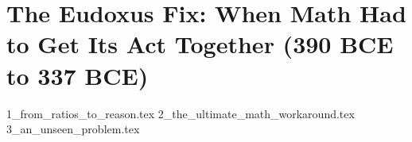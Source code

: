 \section{The Eudoxus Fix: When Math Had to Get Its Act Together (390 BCE to 337 BCE)}

{1_from_ratios_to_reason.tex}
{2_the_ultimate_math_workaround.tex}
{3_an_unseen_problem.tex}




